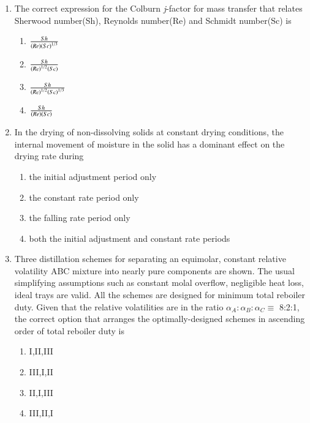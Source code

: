 \documentclass[journal]{IEEEtran}
\begin{document}
\begin{enumerate}
    \item The correct expression for the Colburn \textit{j}-factor for mass transfer that relates Sherwood number(Sh), Reynolds number(Re) and Schmidt number(Sc) is

\begin{multicols}{4}
    \begin{enumerate}
        \item $\frac{Sh}{\left(Re\right)\left(Sc\right)^{1/3}}$
        \item $\frac{Sh}{\left(Re\right)^{1/2}\left(Sc\right)}$
        \item $\frac{Sh}{\left(Re\right)^{1/2}\left(Sc\right)^{1/3}}$
        \item $\frac{Sh}{\left(Re\right)\left(Sc\right)}$
    \end{enumerate}
\end{multicols}
\bigskip
    \item In the drying of non-dissolving solids at constant drying conditions, the internal movement of moisture in the solid has a dominant effect on the drying rate during
\begin{enumerate}
    \item the initial adjustment period only
    \item the constant rate period only
    \item the falling rate period only
    \item both the initial adjustment and constant rate periods
\end{enumerate}
\bigskip
    \item Three distillation schemes for separating an equimolar, constant relative volatility ABC mixture into nearly pure components are shown. The usual simplifying assumptions such as constant molal overflow, negligible heat loss, ideal trays are valid. All the schemes are designed for minimum total reboiler duty. Given that the relative volatilities are in the ratio $\alpha_A:\alpha_B:\alpha_C \equiv$ 8:2:1, the correct option that arranges the optimally-designed schemes in ascending order of total reboiler duty is
\begin{multicols}{3}
 
 


\end{multicols}

\begin{multicols}{4}
    \begin{enumerate}
        \item I,II,III
        \item III,I,II
        \item II,I,III
        \item III,II,I
    \end{enumerate}
\end{multicols}


\end{enumerate}
\end{document}
